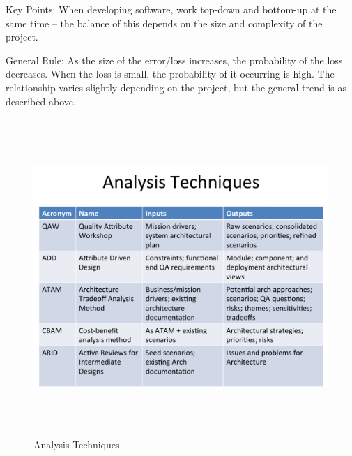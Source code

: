 \documentclass{report}
\begin{document}
Key Points:
When developing software, work top-down and bottom-up at the same time – the balance of this depends on the size and complexity of the project.

General Rule:
As the size of the error/loss increases, the probability of the loss decreases. When the loss is small, the probability of it occurring is high. The relationship varies slightly depending on the project, but the general trend is as described above.

\begin{figure}[h]
\begin{center} 
    \includegraphics[scale=0.8,width = 15cm, height = 12cm]{images/Analysis1.pdf}
    \caption{Analysis Techniques}
\end{center}
\end{figure}
\end{document}
